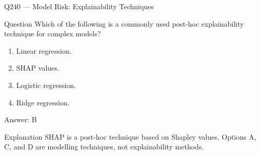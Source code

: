 \documentclass[aspectratio=169,8pt]{beamer}
\begin{document}
																																															\begin{frame}{Q240 --- Model Risk: Explainability Techniques}
																																																\begin{block}{Question}
																																																	Which of the following is a commonly used post-hoc explainability technique for complex models?
																																																	\begin{enumerate}
																																																		\item Linear regression.
																																																		\item SHAP values.
																																																		\item Logistic regression.
																																																		\item Ridge regression.
																																																	\end{enumerate}  \end{block}
																																																	\begin{exampleblock}{Answer: B}\end{exampleblock}
																																																	\begin{block}{Explanation}
																																																		SHAP is a post-hoc technique based on Shapley values. Options A, C, and D are modelling techniques, not explainability methods.
																																																	\end{block}
																																																\end{frame}
																																																
\end{document}
